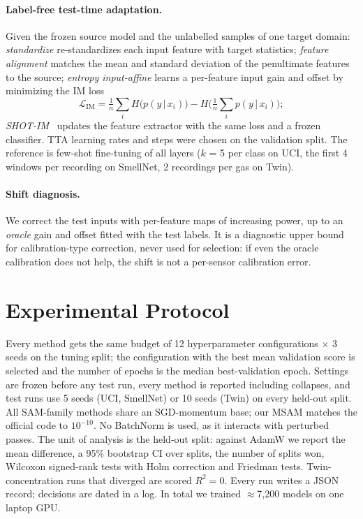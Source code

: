 \documentclass[10pt,twocolumn,letterpaper]{article}
\begin{document}
\paragraph{Label-free test-time adaptation.} Given the frozen source model and the unlabelled samples of one target
domain: \emph{standardize} re-standardizes each input feature with target statistics; \emph{feature alignment}
matches the mean and standard deviation of the penultimate features to the source; \emph{entropy input-affine}
learns a per-feature input gain and offset by minimizing the IM loss
\begin{equation}
\mathcal{L}_{\text{IM}} = \tfrac{1}{n}\textstyle\sum_i H\big(p(y\,|\,x_i)\big) - H\big(\tfrac{1}{n}\sum_i p(y\,|\,x_i)\big);
\end{equation}
\emph{SHOT-IM}~\cite{liang2020shot} updates the feature extractor with the same loss and a frozen classifier. TTA
learning rates and steps were chosen on the validation split. The reference is few-shot fine-tuning of all layers
($k$ = 5 per class on UCI, the first 4 windows per recording on SmellNet, 2 recordings per gas on Twin).

\paragraph{Shift diagnosis.} We correct the test inputs with per-feature maps of increasing power, up to an
\emph{oracle} gain and offset fitted with the test labels. It is a diagnostic upper bound for calibration-type
correction, never used for selection: if even the oracle calibration does not help, the shift is not a per-sensor
calibration error.

\section{Experimental Protocol}
\label{sec:protocol}
Every method gets the same budget of 12 hyperparameter configurations $\times$ 3 seeds on the tuning split; the
configuration with the best mean validation score is selected and the number of epochs is the median
best-validation epoch. Settings are frozen before any test run, every method is reported including collapses, and
test runs use 5 seeds (UCI, SmellNet) or 10 seeds (Twin) on every held-out split. All SAM-family methods share an
SGD-momentum base; our MSAM matches the official code to $10^{-10}$. No BatchNorm is used, as it interacts with
perturbed passes. The unit of analysis is the held-out split: against AdamW we report the mean difference, a 95\%
bootstrap CI over splits, the number of splits won, Wilcoxon signed-rank tests with Holm correction and Friedman
tests. Twin-concentration runs that diverged are scored $R^2=0$. Every run writes a JSON record; decisions are
dated in a log. In total we trained $\approx$7{,}200 models on one laptop GPU.
\end{document}
